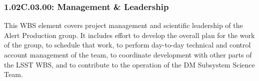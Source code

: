 \subsubsection{1.02C.03.00: Management \& Leadership}

This WBS element covers project management and scientific leadership of the
Alert Production group. It includes effort to develop the overall plan
for the work of the group, to schedule that work, to perform day-to-day
technical and control account management of the team, to coordinate
development with other parts of the LSST WBS, and to contribute to the
operation of the DM Subsystem Science Team.
